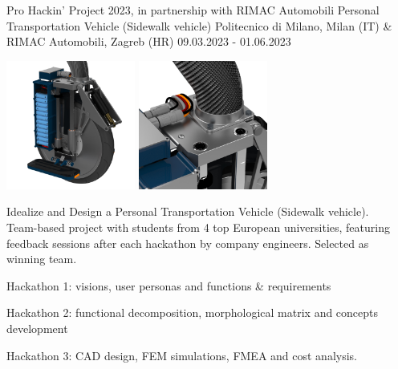\begin{cventries}
    \cventry
    {Pro Hackin' Project 2023, in partnership with RIMAC Automobili}
    {Personal Transportation Vehicle (Sidewalk vehicle)}
    {Politecnico di Milano, Milan (IT) \& RIMAC Automobili, Zagreb (HR)}
    {09.03.2023 - 01.06.2023}
    {
        \begin{minipage}{0.72\textwidth}
            \vspace{5pt}
            \begin{center}
                \includegraphics[height=120pt]{common/img/Rimac/1.jpg}
                \hspace{2cm}
                \includegraphics[height=120pt]{common/img/Rimac/2.jpg}
            \end{center}
            \vspace{5pt}
            Idealize and Design a Personal Transportation Vehicle (Sidewalk vehicle).\\
            Team-based project with students from 4 top European universities, featuring feedback sessions after each hackathon by company engineers. Selected as winning team.\\
            \begin{cvitems}
                \item {Hackathon 1: visions, user personas and functions \& requirements}
                \item {Hackathon 2: functional decomposition, morphological matrix and concepts development}
                \item {Hackathon 3: CAD design, FEM simulations, FMEA and cost analysis.}
            \end{cvitems}

\end{minipage}}
\end{cventries}
